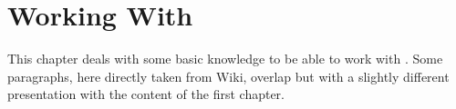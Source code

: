 \chapter{Working With \codeblocks}

This chapter deals with some basic knowledge to be able to work with \codeblocks. Some paragraphs, here directly taken from Wiki, overlap but with a slightly different presentation with the content of the first chapter.

\begin{BUILDPROCESS}

\end{BUILDPROCESS}

\begin{CREATEPROJECT}

\end{CREATEPROJECT}

\begin{DEBUGGING}

\end{DEBUGGING}

\begin{DEBUGGERSCRIPTS}

\end{DEBUGGERSCRIPTS}

\begin{MAKEFILES}

\end{MAKEFILES}

\begin{CBP2MAKE}

\end{CBP2MAKE}

\begin{INTERNATIONALIZATION}

\end{INTERNATIONALIZATION}

